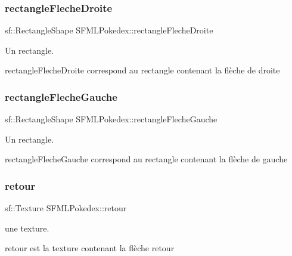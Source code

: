 \subsubsection{\texorpdfstring{rectangle\+Fleche\+Droite}{rectangleFlecheDroite}}
{\footnotesize\ttfamily sf\+::\+Rectangle\+Shape S\+F\+M\+L\+Pokedex\+::rectangle\+Fleche\+Droite\hspace{0.3cm}{\ttfamily [private]}}



Un rectangle. 

rectangle\+Fleche\+Droite correspond au rectangle contenant la flèche de droite \mbox{\label{class_s_f_m_l_pokedex_af6db22bfff2b35c6ce7f143f577b9843}} 
\subsubsection{\texorpdfstring{rectangle\+Fleche\+Gauche}{rectangleFlecheGauche}}
{\footnotesize\ttfamily sf\+::\+Rectangle\+Shape S\+F\+M\+L\+Pokedex\+::rectangle\+Fleche\+Gauche\hspace{0.3cm}{\ttfamily [private]}}



Un rectangle. 

rectangle\+Fleche\+Gauche correspond au rectangle contenant la flèche de gauche \mbox{\label{class_s_f_m_l_pokedex_a74225d2a42d36a1914a45325bc36fa6e}} 
\subsubsection{\texorpdfstring{retour}{retour}}
{\footnotesize\ttfamily sf\+::\+Texture S\+F\+M\+L\+Pokedex\+::retour\hspace{0.3cm}{\ttfamily [private]}}



une texture. 

retour est la texture contenant la flèche retour \mbox{\label{class_s_f_m_l_pokedex_a0c00916cec331e0b16f52744bca0978f}} 

